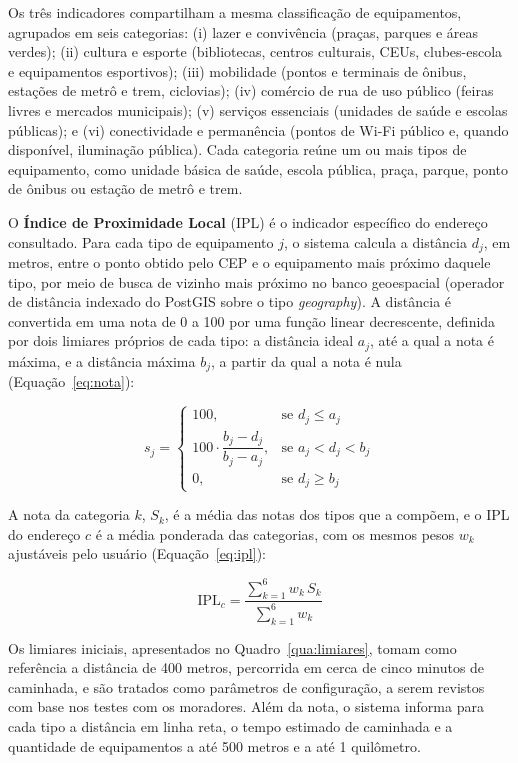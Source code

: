 Os três indicadores compartilham a mesma classificação de equipamentos, agrupados em seis categorias: (i) lazer e convivência (praças, parques e áreas verdes); (ii) cultura e esporte (bibliotecas, centros culturais, CEUs, clubes-escola e equipamentos esportivos); (iii) mobilidade (pontos e terminais de ônibus, estações de metrô e trem, ciclovias); (iv) comércio de rua de uso público (feiras livres e mercados municipais); (v) serviços essenciais (unidades de saúde e escolas públicas); e (vi) conectividade e permanência (pontos de Wi-Fi público e, quando disponível, iluminação pública). Cada categoria reúne um ou mais tipos de equipamento, como unidade básica de saúde, escola pública, praça, parque, ponto de ônibus ou estação de metrô e trem.

O \textbf{Índice de Proximidade Local} (IPL) é o indicador específico do endereço consultado. Para cada tipo de equipamento $j$, o sistema calcula a distância $d_j$, em metros, entre o ponto obtido pelo CEP e o equipamento mais próximo daquele tipo, por meio de busca de vizinho mais próximo no banco geoespacial (operador de distância indexado do PostGIS sobre o tipo \emph{geography}). A distância é convertida em uma nota de 0 a 100 por uma função linear decrescente, definida por dois limiares próprios de cada tipo: a distância ideal $a_j$, até a qual a nota é máxima, e a distância máxima $b_j$, a partir da qual a nota é nula (Equação~\ref{eq:nota}):

\begin{equation}
	\label{eq:nota}
	s_j =
	\begin{cases}
		100,                                    & \text{se } d_j \leq a_j    \\[4pt]
		100 \cdot \dfrac{b_j - d_j}{b_j - a_j}, & \text{se } a_j < d_j < b_j \\[8pt]
		0,                                      & \text{se } d_j \geq b_j
	\end{cases}
\end{equation}

A nota da categoria $k$, $S_k$, é a média das notas dos tipos que a compõem, e o IPL do endereço $c$ é a média ponderada das categorias, com os mesmos pesos $w_k$ ajustáveis pelo usuário (Equação~\ref{eq:ipl}):

\begin{equation}
	\label{eq:ipl}
	\text{IPL}_c = \frac{\sum_{k=1}^{6} w_k \, S_k}{\sum_{k=1}^{6} w_k}
\end{equation}

Os limiares iniciais, apresentados no Quadro~\ref{qua:limiares}, tomam como referência a distância de 400 metros, percorrida em cerca de cinco minutos de caminhada, e são tratados como parâmetros de configuração, a serem revistos com base nos testes com os moradores. Além da nota, o sistema informa para cada tipo a distância em linha reta, o tempo estimado de caminhada e a quantidade de equipamentos a até 500 metros e a até 1 quilômetro.

